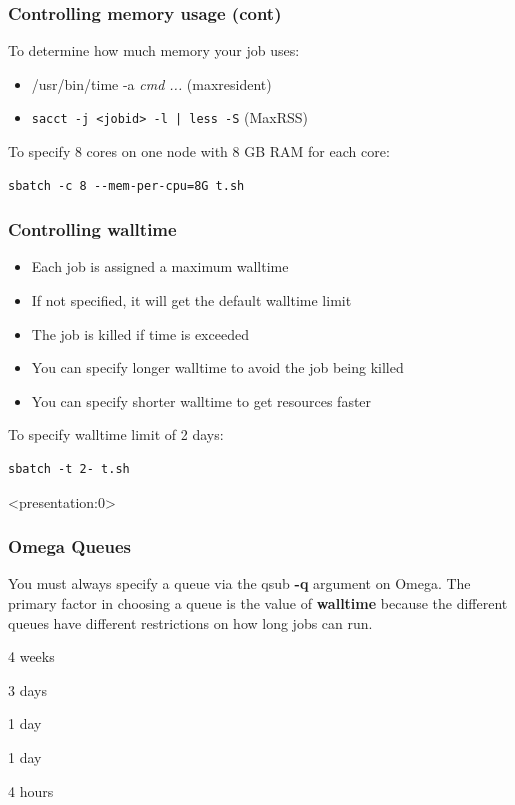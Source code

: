 \documentclass[10pt]{beamer}
\begin{document}
\begin{frame}[fragile]
\frametitle{Controlling memory usage (cont)}

To determine how much memory your job uses:
\begin{itemize}
\item /usr/bin/time -a \textit{cmd ...} (maxresident)
\item \verb+sacct -j <jobid> -l | less -S+ (MaxRSS) 
\end{itemize}

To specify 8 cores on one node with 8 GB RAM for each core:
\begin{verbatim}
sbatch -c 8 --mem-per-cpu=8G t.sh
\end{verbatim}
\end{frame}

\begin{frame}[fragile]
\frametitle{Controlling walltime}
\begin{itemize}
\item Each job is assigned a maximum walltime
\item If not specified, it will get the default walltime limit
\item The job is killed if time is exceeded
\item You can specify longer walltime to avoid the job being killed
\item You can specify shorter walltime to get resources faster
\end{itemize}

To specify walltime limit of 2 days:
\begin{verbatim}
sbatch -t 2- t.sh

\end{verbatim}
\end{frame}

\begin{frame}<presentation:0>
\frametitle{Omega Queues}
You must always specify a queue via the qsub \textbf{-q} argument on
Omega.  The primary factor in choosing a queue is the value of
\textbf{walltime} because the different queues have different
restrictions on how long jobs can run.

\vskip10pt
\begin{description}
\item[fas\_very\_long]       4 weeks
\item[fas\_long]             3 days
\item[fas\_high]             1 day
\item[fas\_normal]           1 day
\item[fas\_devel]            4 hours
\end{description}

\end{frame}
\end{document}

